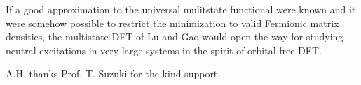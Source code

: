 \documentclass[journal=jpclcd,manuscript=letter]{achemso}
\begin{document}
If a good approximation to the universal mulitstate functional
were known and it were somehow possible to restrict the minimization to valid Fermionic matrix densities,
the multistate DFT of Lu and Gao would open the way for studying neutral excitations in very large systems
in the spirit of orbital-free DFT.











\begin{acknowledgement}
A.H. thanks Prof. T. Suzuki for the kind support.
\end{acknowledgement}
\end{document}
